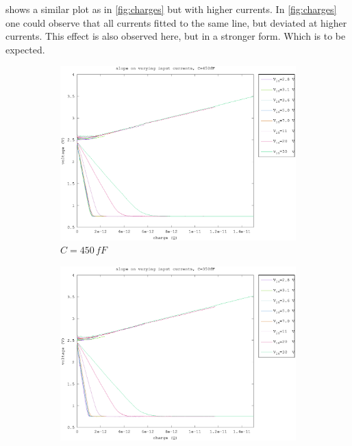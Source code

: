  shows a similar plot as in \cref{fig:charges} but with higher currents. In \cref{fig:charges} one could observe that all currents fitted to the same line, but deviated at higher currents. This effect is also observed here, but in a stronger form. Which is to be expected.

\begin{figure}[h]
	\centering
	\begin{subfigure}[b]{0.475\textwidth}
	    \centering
	    \includegraphics[width=\textwidth]{fig/bre_charge_450fF.eps}
	    \caption[Network2]%
	    {$C=450\,fF$}    
	    \label{fig:bre_charges_450fF}
	\end{subfigure}
	\hfill
	\begin{subfigure}[b]{0.475\textwidth}  
	    \centering 
	    \includegraphics[width=\textwidth]{fig/bre_charge_350fF.eps}

\end{subfigure}
\end{figure}
